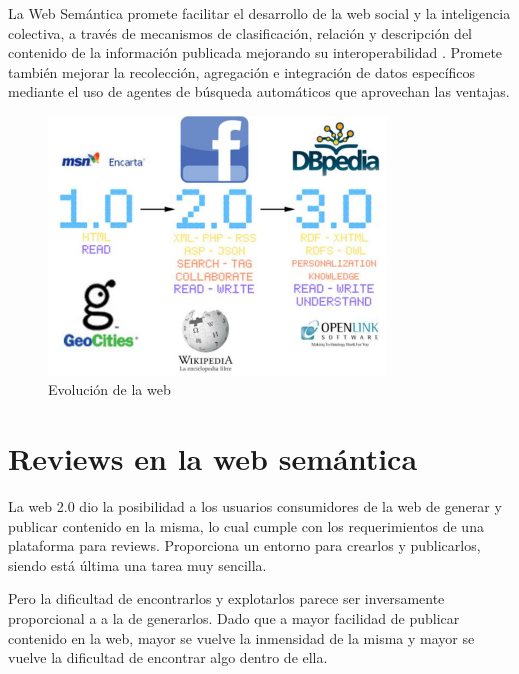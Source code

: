 La Web Semántica promete facilitar el desarrollo de la web social y la inteligencia colectiva, a través de mecanismos de clasificación, relación y descripción del contenido de la información publicada mejorando su interoperabilidad \cite{Antoniou}. Promete también mejorar la recolección, agregación e integración de datos específicos mediante el uso de agentes de búsqueda automáticos que aprovechan las ventajas.

\begin{figure}
    \centering
    \includegraphics[width=0.8\textwidth,natwidth=610,natheight=642]{webevolve}
    \caption{Evolución de la web}
    \label{figure:webevolution}
\end{figure}

\section{Reviews en la web semántica}
\label{section:reviews-en-la-web}

La web 2.0 dio la posibilidad a los usuarios consumidores de la web de generar y publicar contenido en la misma, lo cual cumple con los requerimientos de una plataforma para reviews. Proporciona un entorno para crearlos y publicarlos, siendo está última una tarea muy sencilla. 

Pero la dificultad de encontrarlos y explotarlos parece ser inversamente proporcional a a la de generarlos. Dado que a mayor facilidad de publicar contenido en la web, mayor se vuelve la inmensidad de la misma y mayor se vuelve la dificultad de encontrar algo dentro de ella.

